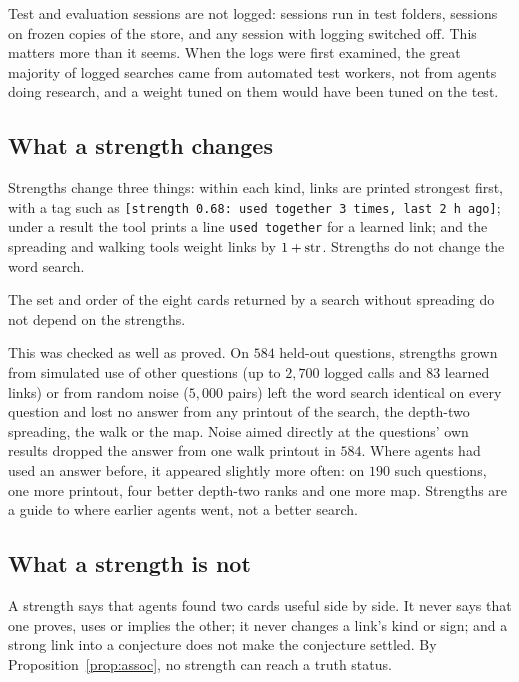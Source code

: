 Test and evaluation sessions are not logged: sessions run in test folders, sessions on frozen copies of the store, and any session with logging switched off. This matters more than it seems. When the logs were first examined, the great majority of logged searches came from automated test workers, not from agents doing research, and a weight tuned on them would have been tuned on the test.

\subsection{What a strength changes}
Strengths change three things: within each kind, links are printed strongest first, with a tag such as \texttt{[strength 0.68: used together 3 times, last 2 h ago]}; under a result the tool prints a line \texttt{used together} for a learned link; and the spreading and walking tools weight links by $1+\operatorname{str}$. Strengths do not change the word search.

\begin{proposition}\label{prop:strength-search}
The set and order of the eight cards returned by a search without spreading do not depend on the strengths. 
\end{proposition}

This was checked as well as proved. On $584$ held-out questions, strengths grown from simulated use of other questions (up to $2{,}700$ logged calls and $83$ learned links) or from random noise ($5{,}000$ pairs) left the word search identical on every question and lost no answer from any printout of the search, the depth-two spreading, the walk or the map. Noise aimed directly at the questions' own results dropped the answer from one walk printout in $584$. Where agents had used an answer before, it appeared slightly more often: on $190$ such questions, one more printout, four better depth-two ranks and one more map. Strengths are a guide to where earlier agents went, not a better search.

\subsection{What a strength is not}
A strength says that agents found two cards useful side by side. It never says that one proves, uses or implies the other; it never changes a link's kind or sign; and a strong link into a conjecture does not make the conjecture settled. By Proposition~\ref{prop:assoc}, no strength can reach a truth status.
